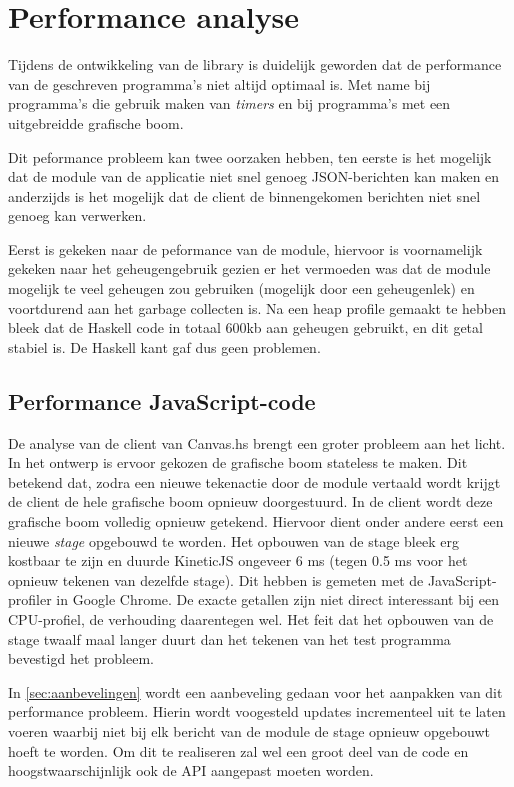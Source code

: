 \section{Performance analyse} \label{sec:performance}

Tijdens de ontwikkeling van de library is duidelijk geworden dat de performance van de geschreven programma's niet altijd optimaal is. Met name bij programma's die gebruik maken van \emph{timers} en bij programma's met een uitgebreidde grafische boom.

Dit peformance probleem kan twee oorzaken hebben, ten eerste is het mogelijk dat de module van de applicatie niet snel genoeg JSON-berichten kan maken en anderzijds is het mogelijk dat de client de binnengekomen berichten niet snel genoeg kan verwerken.

Eerst is gekeken naar de peformance van de module, hiervoor is voornamelijk gekeken naar het geheugengebruik gezien er het vermoeden was dat de module mogelijk te veel geheugen zou gebruiken (mogelijk door een geheugenlek) en voortdurend aan het garbage collecten is. Na een heap profile gemaakt te hebben bleek dat de Haskell code in totaal 600kb aan geheugen gebruikt, en dit getal stabiel is. De Haskell kant gaf dus geen problemen.

\subsection{Performance JavaScript-code}

De analyse van de client van Canvas.hs brengt een groter probleem aan het licht. In het ontwerp is ervoor gekozen de grafische boom stateless te maken. Dit betekend dat, zodra een nieuwe tekenactie door de module vertaald wordt krijgt de client de hele grafische boom opnieuw doorgestuurd. In de client wordt deze grafische boom volledig opnieuw getekend. Hiervoor dient onder andere eerst een nieuwe \emph{stage} opgebouwd te worden.
Het opbouwen van de stage bleek erg kostbaar te zijn en duurde KineticJS ongeveer 6 ms (tegen 0.5 ms voor het opnieuw tekenen van dezelfde stage). Dit hebben is gemeten met de JavaScript-profiler in Google Chrome. De exacte getallen zijn niet direct interessant bij een CPU-profiel, de verhouding daarentegen wel. Het feit dat het opbouwen van de stage twaalf maal langer duurt dan het tekenen van het test programma bevestigd het probleem.

In \autoref{sec:aanbevelingen} wordt een aanbeveling gedaan voor het aanpakken van dit performance probleem. Hierin wordt voogesteld updates incrementeel uit te laten voeren waarbij niet bij elk bericht van de module de stage opnieuw opgebouwt hoeft te worden. Om dit te realiseren zal wel een groot deel van de code en hoogstwaarschijnlijk ook de API aangepast moeten worden.

